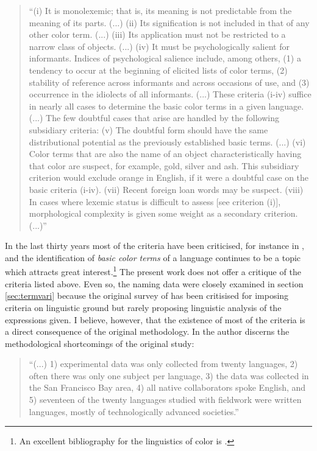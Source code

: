 \begin{quote}
 ``(i) It is monolexemic; that is, its meaning is not predictable from the
meaning of its parts. (...) (ii) Its signification is not included in that of
any other color term. (...) (iii) Its application must not be restricted to a
narrow class of objects. (...) (iv) It must be psychologically salient for
informants. Indices of psychological salience include, among others, (1) a
tendency to occur at the beginning of elicited lists of color terms, (2)
stability of reference across informants and across occasions of use, and (3)
occurrence in the idiolects of all informants. (...) These criteria (i-iv)
suffice in nearly all cases to determine the basic color terms in a given
language. (...) The few doubtful cases that arise are handled by the following
subsidiary criteria: (v) The doubtful form should have the same distributional
potential as the previously established basic terms. (...) (vi) Color terms that
are also the name of an object characteristically having that color are suspect,
for example, gold, silver and ash. This subsidiary criterion would exclude
orange in English, if it were a doubtful case on the basic criteria (i-iv).
(vii) Recent foreign loan words may be suspect. (viii) In cases where lexemic
status is difficult to assess [see criterion (i)], morphological complexity is
given some weight as a secondary criterion. (...)''
\end{quote}


In the last thirty years most of the criteria have been criticised,  for
instance in 
\citet{Craw82, MacL97, Lucy97},  and the identification of
\textit{basic color
terms} of a language continues to be a topic which attracts great
interest.\footnote{An excellent bibliography for  the linguistics of color  is
\cite{Uusk08}.} The present work does
not offer a critique of the  criteria listed above. Even so,  the naming data
were
closely examined in section
\ref{sec:termvari}
because the original survey of \cite{Berl69} has been critisised for
imposing criteria
on linguistic ground but rarely proposing linguistic analysis of the
expressions
given. I believe, however,  that the existence of most of the criteria is a
direct
consequence of the original methodology. In    \cite{Kay06} the author discerns
the methodological shortcomings  of the original study: 

\begin{quote}
``(...) 1) experimental data was only collected from twenty languages, 2) often
there was only one subject per language, 3) the data was collected in the San
Francisco Bay area, 4) all native collaborators spoke English, and 5) seventeen
of the twenty languages studied with fieldwork were written languages, mostly of
technologically advanced societies.'' \hfill{\cite[119]{Kay06}}
\end{quote}

